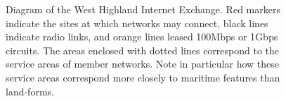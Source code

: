 
\begin{figure}[h]
  \resizebox{\linewidth}{!}{
    \begin{tikzpicture}
      \whixphysicaldiagram
    \end{tikzpicture}
  }
  \caption{
  Diagram of the West Highland Internet Exchange. Red markers indicate
  the sites at which networks may connect, black lines indicate radio
  links, and orange lines leased 100Mbps or 1Gbps circuits. The areas
  enclosed with dotted lines correspond to the service areas of member
  networks. Note in particular how these service areas correspond more 
  closely to maritime features than land-forms.
  }
\end{figure}